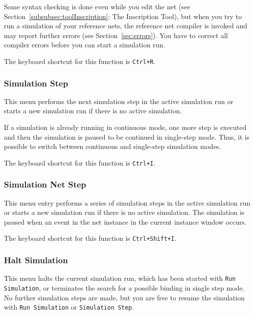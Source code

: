 Some syntax checking is done even while you edit the net (see
Section~\ref{subsubsec:toolInscription}: The Inscription Tool),
but when you try to run a simulation of your reference nets,
the reference net compiler is invoked and
may report further errors (see Section~\ref{sec:errors}).
You have to correct all compiler errors before you can start a simulation
run.

The keyboard shortcut for this function is \texttt{Ctrl+R}.

\subsubsection{Simulation Step}

This menu performs the next simulation step in the active simulation
run or starts a new simulation run if there is no active simulation.

If a simulation is already running in continuous mode, one more step
is executed and then the simulation is paused to be continued in
single-step mode.
Thus, it is possible to switch between continuous and single-step
simulation modes.

The keyboard shortcut for this function is \texttt{Ctrl+I}.

\subsubsection{Simulation Net Step}
This menu entry performs a series of simulation steps in the active
simulation run or starts a new simulation run if there is no active
simulation.
The simulation is paused when an event in the net instance in the current
instance window occurs.%

The keyboard shortcut for this function is \texttt{Ctrl+Shift+I}.

\subsubsection{Halt Simulation}

This menu halts the current simulation run, which has been
started with \texttt{Run Simulation}, or terminates the
search for a possible binding in single step mode.
No further simulation steps are made, but you are free
to resume the simulation with \texttt{Run Simulation} or
\texttt{Simulation Step}.


